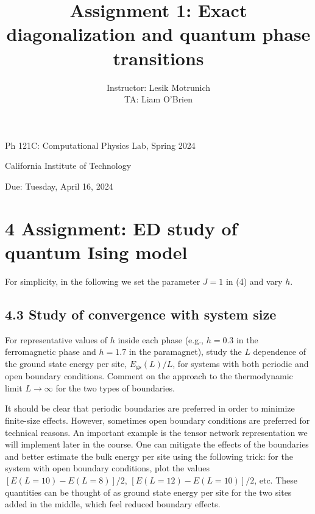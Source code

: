 \documentclass[12pt]{article}
\title{Assignment 1: Exact diagonalization and quantum phase transitions }
\author{Instructor: Lesik Motrunich\\
TA: Liam O'Brien}
\date{}
\begin{document}
\maketitle
Ph 121C: Computational Physics Lab, Spring 2024

California Institute of Technology

Due: Tuesday, April 16, 2024







\section*{4 Assignment: ED study of quantum Ising model}
For simplicity, in the following we set the parameter $J=1$ in (4) and vary $h$.









\subsection*{4.3 Study of convergence with system size}
For representative values of $h$ inside each phase (e.g., $h=0.3$ in the ferromagnetic phase and $h=1.7$ in the paramagnet), study the $L$ dependence of the ground state energy per site, $E_{\mathrm{gs}}(L) / L$, for systems with both periodic and open boundary conditions. Comment on the approach to the thermodynamic limit $L \rightarrow \infty$ for the two types of boundaries.



It should be clear that periodic boundaries are preferred in order to minimize finite-size effects. However, sometimes open boundary conditions are preferred for technical reasons. An important example is the tensor network representation we will implement later in the course. One can mitigate the effects of the boundaries and better estimate the bulk energy per site using the following trick: for the system with open boundary conditions, plot the values $[E(L=10)-E(L=8)] / 2$, $[E(L=12)-E(L=10)] / 2$, etc. These quantities can be thought of as ground state energy per site for the two sites added in the middle, which feel reduced boundary effects.
\end{document}
